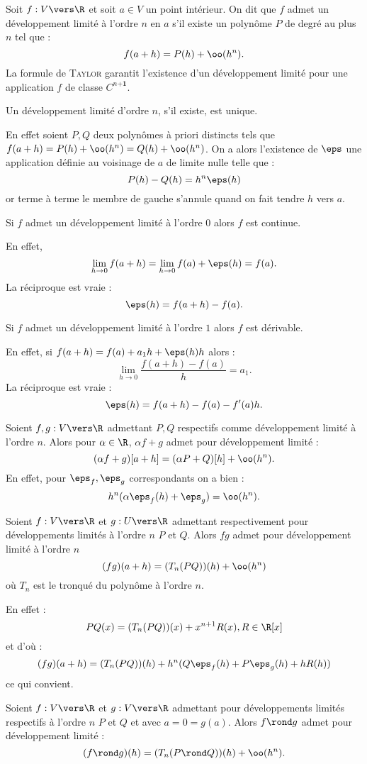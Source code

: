 \documentclass{mybourbaki}
\begin{document}
\bigbreak

\propt{} Soit $f: V \vers \R$ et soit $a\in V$ un point intérieur. On dit que $f$ admet un développement limité à l'ordre $n$ en $a$ s'il existe un polynôme $P$ de degré au plus $n$ tel que : \[ f(a+h) = P(h) + \oo(h^{n}).\]
La formule de \textsc{Taylor} garantit l'existence d'un développement limité pour une application $f$ de classe $C^{n\boldsymbol{+1}}$.

\propt{}Un développement limité d'ordre $n$, s'il existe, est unique.

En effet soient $P,Q$ deux polynômes à priori distincts tels que $f(a+h) = P(h) + \oo(h^{n}) = Q(h) + \oo(h^{n})$. On a alors l'existence de $\eps$ une application définie au voisinage de $a$ de limite nulle telle que : \[ P(h) - Q(h) = h^{n}\eps(h)\]or terme à terme le membre de gauche s'annule quand on fait tendre $h$ vers $a$.

\bigbreak

\propt{}Si $f$ admet un développement limité à l'ordre $0$ alors $f$ est continue.

En effet, \[\lim_{h\to 0}f(a+h) = \lim_{h\to 0}f(a) + \eps(h) = f(a). \]
La réciproque est vraie : \[ \eps(h) = f(a+h) - f(a).\]

\propt{}Si $f$ admet un développement limité à l'ordre $1$ alors $f$ est dérivable.

En effet, si $f(a+h) = f(a) + a_1 h + \eps(h)h$ alors : \[ \lim_{h\to 0}\frac{f(a+h) - f(a)}{h} = a_1.\]
La réciproque est vraie : \[ \eps(h) = f(a+h) - f(a) - f'(a)h.\]

\bigbreak

\propt{}Soient $f,g : V \vers \R$ admettant $P,Q$ respectifs comme développement limité à l'ordre $n$. Alors pour $\alpha\in \R$, $\alpha f +g$ admet pour développement limité : \[ (\alpha f+g)[a+h] = (\alpha P+Q)[h] + \oo(h^{n}).\]
En effet, pour $\eps_f,\eps_g$ correspondants on a bien : \[ h^{n}(\alpha \eps_f(h) + \eps_g) = \oo(h^{n}).\]

\propt{}Soient $f : V \vers \R$ et $g : U \vers \R$ admettant respectivement pour développements limités à l'ordre $n$ $P$ et $Q$. Alors $fg$ admet pour développement limité à l'ordre $n$ \[ (fg)(a+h) = (T_n(P Q))(h) + \oo(h^{n})\]où $T_n$ est le tronqué du polynôme à l'ordre $n$.

En effet : \[ PQ(x)= (T_n(PQ))(x) + x^{n+1}R(x), R\in \R[x]\]et d'où : \[ (fg)(a+h) = (T_n(PQ))(h) + h^{n}(Q\eps_f(h) + P\eps_g(h) + hR(h))\]ce qui convient.

\propt{}Soient $f : V\vers \R$ et $g : V \vers \R$ admettant pour développements limités respectifs à l'ordre $n$ $P$ et $Q$ et avec $a=0=g(a)$. Alors $f\rond g$ admet pour développement limité : \[ (f\rond g)(h) = (T_n(P\rond Q))(h) + \oo(h^{n}).\]
\end{document}
